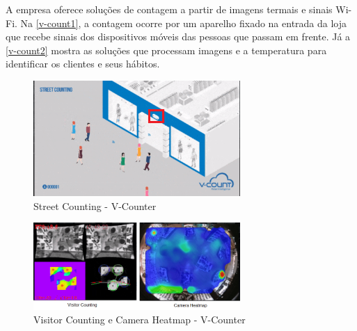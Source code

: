 A empresa  oferece soluções de contagem a partir de imagens termais e sinais Wi-Fi. Na \autoref{v-count1}, a contagem ocorre por um
aparelho fixado na entrada da loja que recebe sinais dos dispositivos móveis das pessoas que passam em frente. Já a \autoref{v-count2}
mostra as soluções que processam imagens e a temperatura para identificar os clientes e seus hábitos.

\begin{figure}[htb]
  \caption{\label{v-count1}Street Counting - V-Counter}
  \begin{center}
    \includegraphics[width=0.70\textwidth]{img/v-count.png}
  \end{center}
\end{figure}

\begin{figure}[htb]
  \caption{\label{v-count2}Visitor Counting e Camera Heatmap - V-Counter}
  \begin{center}
    \includegraphics[width=0.70\textwidth]{img/termal-vcount.png}
  \end{center}
\end{figure}

